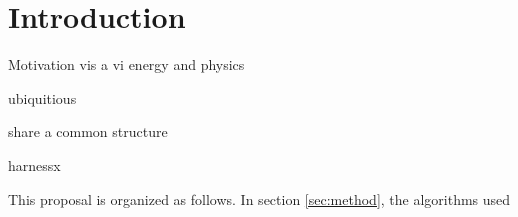 \section{Introduction}

Motivation vis a vi energy and physics


ubiquitious

share a common structure

harnessx

This proposal is organized as follows. In section \ref{sec:method},
the algorithms used 
